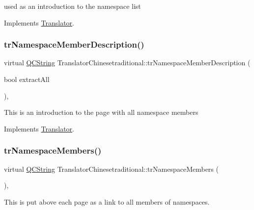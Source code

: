 used as an introduction to the namespace list 

Implements \mbox{\hyperlink{class_translator}{Translator}}.

\mbox{\label{class_translator_chinesetraditional_a171a9f55c053e186ccbdeb618926078c}} 
\subsubsection{\texorpdfstring{trNamespaceMemberDescription()}{trNamespaceMemberDescription()}}
{\footnotesize\ttfamily virtual \mbox{\hyperlink{class_q_c_string}{Q\+C\+String}} Translator\+Chinesetraditional\+::tr\+Namespace\+Member\+Description (\begin{DoxyParamCaption}\item[{bool}]{extract\+All }\end{DoxyParamCaption})\hspace{0.3cm}{\ttfamily [inline]}, {\ttfamily [virtual]}}

This is an introduction to the page with all namespace members 

Implements \mbox{\hyperlink{class_translator}{Translator}}.

\mbox{\label{class_translator_chinesetraditional_a3aec65a28c2b177db121ad1645413e3b}} 
\subsubsection{\texorpdfstring{trNamespaceMembers()}{trNamespaceMembers()}}
{\footnotesize\ttfamily virtual \mbox{\hyperlink{class_q_c_string}{Q\+C\+String}} Translator\+Chinesetraditional\+::tr\+Namespace\+Members (\begin{DoxyParamCaption}{ }\end{DoxyParamCaption})\hspace{0.3cm}{\ttfamily [inline]}, {\ttfamily [virtual]}}

This is put above each page as a link to all members of namespaces. 

